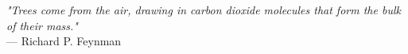\begin{flushright}
\emph{"Trees come from the air, drawing in carbon dioxide molecules that form the bulk of their mass."}\\
 — Richard P. Feynman
\end{flushright}